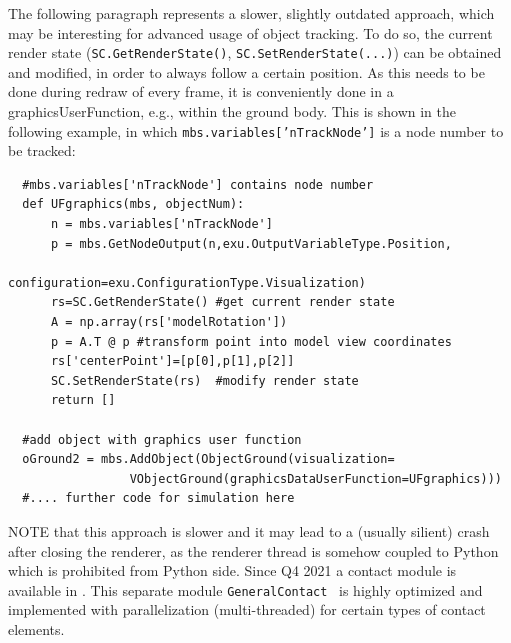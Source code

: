 The following paragraph represents a slower, slightly outdated approach, which may be interesting for advanced usage of object tracking.
To do so, the current render state (\texttt{SC.GetRenderState()}, \texttt{SC.SetRenderState(...)}) can be obtained and modified, in order to always follow a certain position.
As this needs to be done during redraw of every frame, it is conveniently done in a graphicsUserFunction, e.g., within the ground body. This is shown in the following example, in which \texttt{mbs.variables['nTrackNode']} is a node number to be tracked:
%
\pythonstyle\begin{lstlisting}
  #mbs.variables['nTrackNode'] contains node number
  def UFgraphics(mbs, objectNum):
      n = mbs.variables['nTrackNode']
      p = mbs.GetNodeOutput(n,exu.OutputVariableType.Position, 
                            configuration=exu.ConfigurationType.Visualization)
      rs=SC.GetRenderState() #get current render state
      A = np.array(rs['modelRotation'])
      p = A.T @ p #transform point into model view coordinates
      rs['centerPoint']=[p[0],p[1],p[2]]
      SC.SetRenderState(rs)  #modify render state
      return []

  #add object with graphics user function
  oGround2 = mbs.AddObject(ObjectGround(visualization=
                 VObjectGround(graphicsDataUserFunction=UFgraphics)))
  #.... further code for simulation here
\end{lstlisting}
NOTE that this approach is slower and it may lead to a (usually silient) crash after closing the renderer, as the renderer thread is somehow coupled to Python which is prohibited from Python side.
%
%
Since Q4 2021 a contact module is available in \codeName. 
This separate module \texttt{GeneralContact} \lbrack{}\rbrack\ is highly optimized and implemented with parallelization (multi-threaded) for certain types of contact elements.
%
%
%

